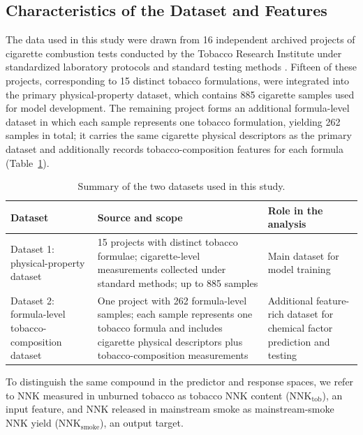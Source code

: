 ﻿\documentclass[a4paper,fleqn]{cas-sc}
\begin{document}
\subsection{Characteristics of the Dataset and Features}

The data used in this study were drawn from 16 independent archived projects of cigarette combustion tests conducted by the Tobacco Research Institute under standardized laboratory protocols and standard testing methods \cite{gb19609,gb23356,yc253,gb23228,yc377,gb21130,yc255,yc254}. Fifteen of these projects, corresponding to 15 distinct tobacco formulations, were integrated into the primary physical-property dataset, which contains 885 cigarette samples used for model development. The remaining project forms an additional formula-level dataset in which each sample represents one tobacco formulation, yielding 262 samples in total; it carries the same cigarette physical descriptors as the primary dataset and additionally records tobacco-composition features for each formula (Table~\ref{tab:dataset_summary}).

\begin{table}[pos=h]
    \centering
    \caption{Summary of the two datasets used in this study.}
    \label{tab:dataset_summary}
    \begin{tabular}{p{} p{} p{}}
        \toprule
        Dataset & Source and scope & Role in the analysis \\
        \midrule
        Dataset 1: physical-property dataset & 15 projects with distinct tobacco formulae; cigarette-level measurements collected under standard methods; up to 885 samples & Main dataset for model training \\
        Dataset 2: formula-level tobacco-composition dataset & One project with 262 formula-level samples; each sample represents one tobacco formula and includes cigarette physical descriptors plus tobacco-composition measurements & Additional feature-rich dataset for chemical factor prediction and testing \\
        \bottomrule
    \end{tabular}
\end{table}

To distinguish the same compound in the predictor and response spaces, we refer to NNK measured in unburned tobacco as tobacco NNK content ($\mathrm{NNK}_{\mathrm{tob}}$), an input feature, and NNK released in mainstream smoke as mainstream-smoke NNK yield ($\mathrm{NNK}_{\mathrm{smoke}}$), an output target.
\end{document}
